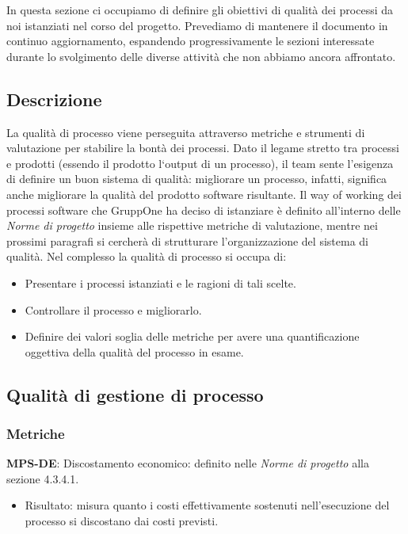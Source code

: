 \documentclass[../piano-di-qualifica.tex]{subfiles}
\begin{document}
In questa sezione ci occupiamo di definire gli obiettivi di qualità dei processi da noi istanziati nel corso del progetto.
Prevediamo di mantenere il documento in continuo aggiornamento, espandendo progressivamente le sezioni interessate durante lo svolgimento delle diverse attività che non abbiamo ancora affrontato.

\subsection{Descrizione}%
\label{sub:descrizione}

La qualità di processo viene perseguita attraverso metriche e strumenti di valutazione per stabilire la bontà dei processi.
Dato il legame stretto tra processi e prodotti (essendo il prodotto l`output di un processo), il team sente l'esigenza di definire un buon sistema di qualità: migliorare un processo, infatti, significa anche migliorare la qualità del prodotto software risultante.
Il way of working dei processi software che GruppOne ha deciso di istanziare è definito all'interno delle \textit{Norme di progetto} insieme alle rispettive metriche di valutazione, mentre nei prossimi paragrafi si cercherà di strutturare l'organizzazione del sistema di qualità.
Nel complesso la qualità di processo si occupa di:
\begin{itemize}
  \item Presentare i processi istanziati e le ragioni di tali scelte.
  \item Controllare il processo e migliorarlo.
  \item Definire dei valori soglia delle metriche per avere una quantificazione oggettiva della qualità del processo in esame.
\end{itemize}

\subsection{Qualità di gestione di processo}


\subsubsection{Metriche}%
\label{par:metriche_doc}

\textbf{MPS-DE}: Discostamento economico: definito nelle \textit{Norme di progetto} alla sezione 4.3.4.1.
\begin{itemize}
  \item Risultato: misura quanto i costi effettivamente sostenuti nell’esecuzione del
  processo si discostano dai costi previsti.
\end{itemize}
\end{document}
